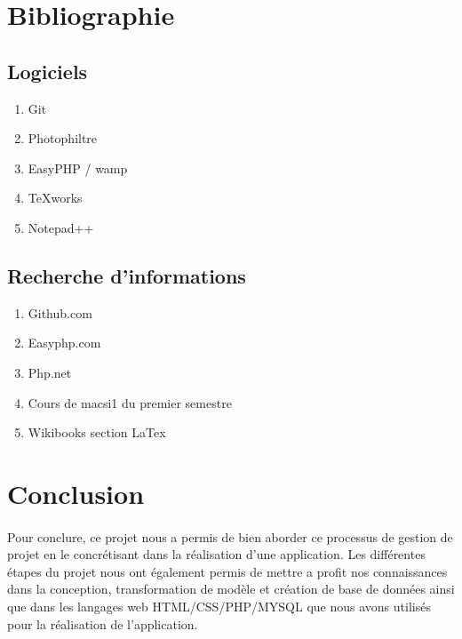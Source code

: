 \documentclass[a4paper, 12pt]{article}
\begin{document}
\newpage

\section{Bibliographie}
\subsection{Logiciels}
\begin{enumerate}
	\item Git
	\item Photophiltre
	\item EasyPHP / wamp
	\item TeXworks
	\item Notepad++
\end{enumerate}

\subsection{Recherche d’informations}
\begin{enumerate}
	\item Github.com
	\item Easyphp.com
	\item Php.net
	\item Cours de macsi1 du premier semestre
	\item Wikibooks section LaTex
\end{enumerate}

\newpage

\section{Conclusion}
\paragraph{}Pour conclure, ce projet nous a permis de bien aborder ce processus de gestion de projet en le concrétisant dans la réalisation d'une application. Les différentes étapes du projet nous ont également permis de mettre a profit nos connaissances dans la conception, transformation de modèle et création de base de données ainsi que dans les langages web HTML/CSS/PHP/MYSQL que nous avons utilisés pour la réalisation de l'application.
\end{document}
